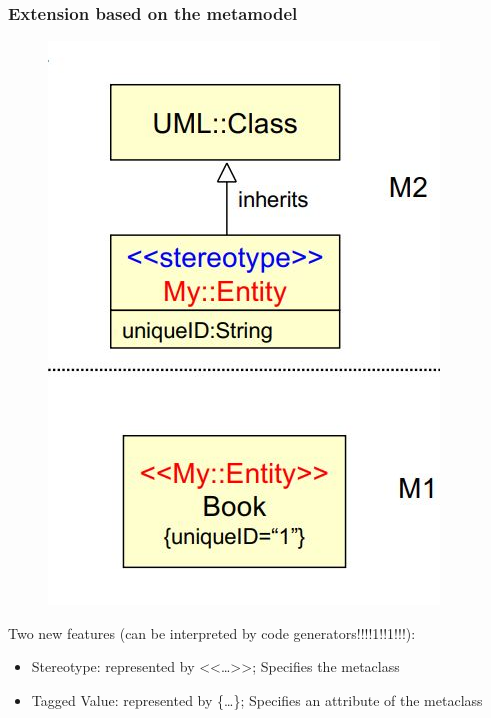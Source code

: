 			\subsubsection{Extension based on the metamodel}
				\begin{figure}[h!]
					\includegraphics[scale=0.3]{res/uml-extension-metamodel.jpg}
				\end{figure}
				Two new features (can be interpreted by code generators!!!!1!!1!!!):
				\begin{itemize}
					\item Stereotype: represented by <<\ldots>>; Specifies the metaclass
					\item Tagged Value: represented by \{\ldots\}; Specifies an attribute of the metaclass
				\end{itemize}
				
